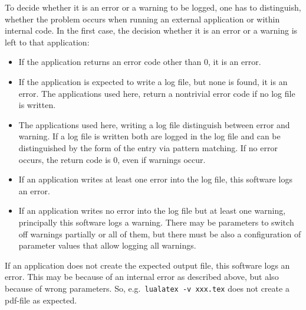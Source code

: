 To decide whether it is an error or a warning to be logged, 
one has to distinguish, 
whether the problem occurs when running an external application 
or within internal code. 
In the first case, the decision whether it is an error or a warning 
is left to that application: 
%
\begin{itemize}
\item 
If the application returns an error code other than 0, 
it is an error. 
\item
If the application is expected to write a log file, 
but none is found, it is an error. 
The applications used here, 
return a nontrivial error code if no log file is written. 
\item
The applications used here, writing a log file 
distinguish between error and warning. 
If a log file is written both are logged in the log file 
and can be distinguished by the form of the entry via pattern matching. 
If no error occurs, the return code is 0, even if warnings occur. 
\item
If an application writes at least one error into the log file, 
this software logs an error. 
\item
If an application writes no error into the log file 
but at least one warning, principally this software logs a warning. 
There may be parameters to switch off warnings partially 
or all of them, 
but there must be also a configuration of parameter values 
that allow logging all warnings. 
\end{itemize}

If an application does not create the expected output file, 
this software logs an error. 
This may be because of an internal error as described above, 
but also because of wrong parameters. 
So, 
e.g.~\texttt{lualatex -v xxx.tex} 
does not create a pdf-file as expected. 



